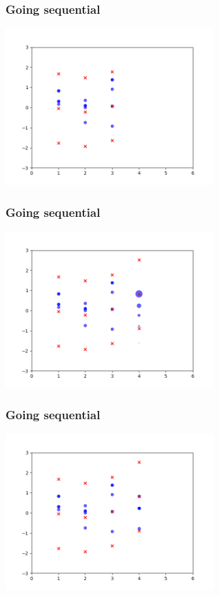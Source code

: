 \documentclass{beamer}
\begin{document}
\begin{frame}[fragile]
\frametitle{Going sequential}

\begin{center}
\includegraphics[width=80mm]{pfilt_anim_6.png}
\end{center}

\end{frame}
\begin{frame}[fragile]
\frametitle{Going sequential}

\begin{center}
\includegraphics[width=80mm]{pfilt_anim_7.png}
\end{center}

\end{frame}
\begin{frame}[fragile]
\frametitle{Going sequential}

\begin{center}
\includegraphics[width=80mm]{pfilt_anim_8.png}
\end{center}

\end{frame}
\end{document}

